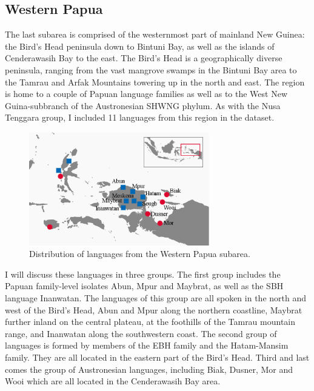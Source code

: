 \subsection{Western Papua}\label{sec:westpapua2}

The last subarea is comprised of the westernmost part of mainland New Guinea: the Bird's Head peninsula down to Bintuni Bay, as well as the islands of Cenderawasih Bay to the east. The Bird's Head is a geographically diverse peninsula, ranging from the vast mangrove swamps in the Bintuni Bay area to the Tamrau and Arfak Mountains towering up in the north and east. The region is home to a couple of Papuan language families as well as to the West New Guina-subbranch of the Austronesian SHWNG phylum. As with the Nusa Tenggara group, I included 11 languages from this region in the dataset. 

\begin{figure}

\includegraphics[width=0.7\textwidth]{figures/Map_Papua2.eps}
\caption{Distribution of languages from the Western Papua subarea.}\label{map:Pap}

\end{figure}

I will discuss these languages in three groups. The first group includes the Papuan family-level isolates Abun, Mpur and Maybrat, as well as the \textsc{SBH} language Inanwatan. The languages of this group are all spoken in the north and west of the Bird's Head, Abun and Mpur along the northern coastline, Maybrat further inland on the central plateau, at the foothills of the Tamrau mountain range, and Inanwatan along the southwestern coast. The second group of languages is formed by members of the EBH family and the Hatam-Mansim family. They are all located in the eastern part of the Bird's Head. Third and last comes the group of Austronesian languages, including Biak, Dusner, Mor and Wooi which are all located in the Cenderawasih Bay area.

